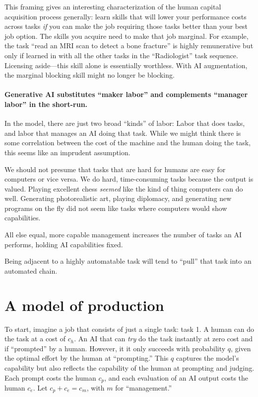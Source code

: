 \documentclass{article}
\begin{document}
This framing gives an interesting characterization of the human capital acquisition process  generally: learn skills that will lower your performance costs across tasks \emph{if} you can make the job requiring those tasks better than your best job option.
The skills you acquire need to make that job marginal. 
For example, the task ``read an MRI scan to detect a bone fracture'' is highly remunerative but only if learned in with all the other tasks in the ``Radiologist'' task sequence.
Licensing aside---this skill alone is essentially worthless.  
With AI augmentation, the marginal blocking skill might no longer be blocking. 

\paragraph{Generative AI substitutes ``maker labor'' and complements ``manager labor'' in the short-run.}
In the model, there are just two broad ``kinds'' of labor: 
Labor that does tasks, and labor that manages an AI doing that task. 
While we might think there is some correlation between the cost of the machine and the human doing the task, this seems like an imprudent assumption.

We should not presume that tasks that are hard for humans are easy for computers or vice versa. 
We do hard, time-consuming tasks because the output is valued. 
Playing excellent chess \emph{seemed} like the kind of thing computers can do well. 
Generating photorealistic art, playing diplomacy, and generating new programs on the fly did not seem like tasks where computers would show capabilities.

All else equal, more capable management increases the number of tasks an AI performs, holding AI capabilities fixed. 

Being adjacent to a highly automatable task will tend to ``pull'' that task into an automated chain.


\section{A model of production}
To start, imagine a job that consists of just a single task: task 1.
A human can do the task at a cost of $c_h$.
An AI that can \emph{try} do the task instantly at zero cost and if ``prompted'' by a human.
However, it it only succeeds with probability $q$, given the optimal effort by the human at ``prompting.''
This $q$ captures the model's capability but also reflects the capability of the human at prompting and judging.
Each prompt costs the human $c_p$, and each evaluation of an AI output costs the human $c_e$.
Let $c_p + c_e = c_m$, with $m$ for ``management.''
\end{document}
